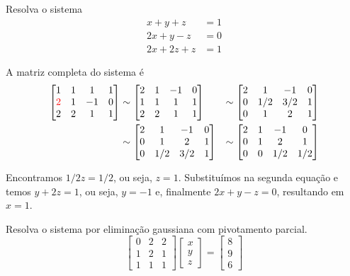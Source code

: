 \begin{ex} Resolva o sistema
\begin{align}
  x+y+z &=1\\
  2x+y-z&=0\\
  2x+2z+z&=1
\end{align}

\end{ex}

\begin{sol}
A matriz completa do sistema é
\begin{align}
  \begin{bmatrix}
  1 &1&  1&1\\
  {\color{red}{2}} &1& -1&0\\
  2 & 2 &1&1
  \end{bmatrix}
&\sim
  \begin{bmatrix}
  2 &1& -1&0\\
  1 &1&  1&1\\
  2 &2&  1&1
  \end{bmatrix} 
&\sim 
  \begin{bmatrix}
  2 &1& -1&0\\
  0 &1/2& 3/2&1\\
  0 & 1 &2&1
  \end{bmatrix}\\
&\sim
  \begin{bmatrix}
  2 &1& -1&0\\
  0 & 1 &2&1\\
  0 &1/2& 3/2&1
  \end{bmatrix}
&\sim 
  \begin{bmatrix}
  2 &1& -1&0\\
  0 & 1 &2&1\\
  0 &0& 1/2&1/2
  \end{bmatrix}
\end{align}

Encontramos $1/2z=1/2$, ou seja, $z=1$. Substituímos na segunda equação e temos $y+2z=1$, ou seja, $y=-1$ e, finalmente $2x+y-z=0$, resultando em $x=1$.
\end{sol}

\begin{ex}
Resolva o sistema por eliminação gaussiana com pivotamento parcial.
\begin{equation*}
\left[
\begin{array}{ccc}
0 &2& 2\\
1 &2& 1\\
1 & 1 &1
\end{array}
\right]
\left[
\begin{array}{c}
x\\
y\\
z
\end{array}
\right]=
\left[
\begin{array}{c}
8\\
9\\
6
\end{array}
\right]  
\end{equation*}
\end{ex}

